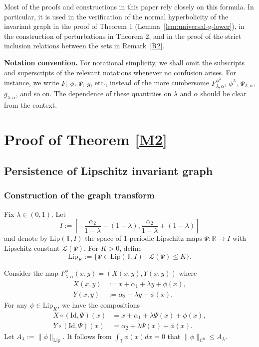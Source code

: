 \documentclass{amsart}
\newcommand{\R}{\mathbb{R}}
\newcommand{\Lip}{\mathrm{Lip}}
\newcommand{\la}{\lambda}
\newcommand{\al}{\alpha}
\newcommand{\T}{\mathbb{T}}
\begin{document}
	Most of the proofs and constructions in this paper rely closely on this formula. In particular, it is used in the verification of the normal hyperbolicity of the invariant graph in the proof of Theorem 1 (Lemma~\ref{lem:universal-g-lower}), in the construction of perturbations in Theorem 2, and in the proof of the strict inclusion relations between the sets in Remark~\ref{R2}.
	
	
	\vspace{1ex}
	\noindent\textbf{Notation convention.} For notational simplicity, we shall omit the subscripts and superscripts of the relevant notations whenever no confusion arises. For instance, we write \(F\), \(\phi\), \(\Psi\), \(g\), etc., instead of the more cumbersome \(F_{\lambda,\alpha}^{\phi^\lambda}\), \(\phi^\lambda\), \(\Psi_{\lambda,\alpha}\), \(g_{\lambda,\alpha}\), and so on. The dependence of these quantities on \(\lambda\) and \(\alpha\) should be clear from the context.
	
	\section{\sc Proof of Theorem \ref{M2}}
	\subsection{Persistence of Lipschitz invariant graph}
	
	\subsubsection{Construction of the graph transform}
	Fix $\la\in (0,1)$. Let \begin{equation}\label{iI}
		I := \left[-\frac{\al_2}{1-\la}-(1-\lambda), \frac{\al_2}{1-\la}+(1-\lambda)\right]
	\end{equation}and denote by $\Lip(\T, I)$ the space of 1-periodic Lipschitz maps $\Psi: \R \to I$ with Lipschitz constant $\mathcal{L}(\Psi)$. For $K > 0$, define
	\[
	\Lip_K := \{\Psi \in \Lip(\T, I) \mid \mathcal{L}(\Psi) \leq K\}.
	\]
	
	Consider the map ${F_{\lambda,\alpha}^\phi}(x,y) = (X(x,y), Y(x,y))$ where
	\begin{align*}
		X(x,y) &:= x + \alpha_1 + \lambda y + \phi(x), \\
		Y(x,y) &:= \al_2+\lambda y + \phi(x).
	\end{align*}
	For any $\psi \in \Lip_K$, we have the compositions
	\begin{align*}
		X \circ (\mathrm{Id}, \Psi)(x) &= x + \alpha_1 + \lambda \Psi(x) + \phi(x), \\
		Y \circ (\mathrm{Id}, \Psi)(x) &= \al_2+\lambda \Psi(x) + \phi(x).
	\end{align*}
	Let $A_\lambda := \|\phi\|_{\mathrm{Lip}}$. It follows from $\int_\T\phi(x)dx=0$ that $\|\phi\|_{C^0}\leq A_\lambda$.
	
\end{document}
